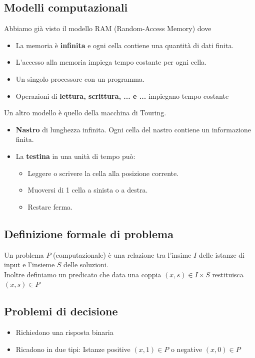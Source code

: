 \documentclass{article}
\begin{document}
\subsection{Modelli computazionali}
Abbiamo già visto il modello RAM (Random-Access Memory) dove
\begin{itemize}
  \item La memoria è \textbf{infinita} e ogni cella contiene una quantità di dati finita.
  \item L'acecsso alla memoria impiega tempo costante per ogni cella.
  \item Un singolo processore con un programma.
  \item Operazioni di \textbf{lettura, scrittura, ... e ...} impiegano tempo costante
\end{itemize}
Un altro modello è quello della macchina di Touring.
\begin{itemize}
  \item \textbf{Nastro} di lunghezza infinita. Ogni cella del nastro contiene un informazione finita.
  \item La \textbf{testina} in una unità di tempo può:
        \begin{itemize}
          \item Leggere o scrivere la cella alla posizione corrente.
          \item Muoversi di 1 cella a sinista o a destra.
          \item Restare ferma.
        \end{itemize}
\end{itemize}

\subsection{Definizione formale di problema}
Un problema \(P\) (computazionale) è una relazione tra l'insime \(I\) delle istanze di input e l'insieme \(S\) delle soluzioni.\\
Inoltre definiamo un predicato che data una coppia \((x,s) \in I \times S\) restituisca \((x,s) \in P\)
\subsection*{Problemi di decisione}
\begin{itemize}
  \item Richiedono una risposta binaria
  \item Ricadono in due tipi: Istanze positive \((x,1) \in P\) o negative \((x,0) \in P\)
\end{itemize}
\end{document}
